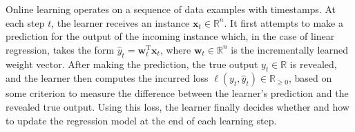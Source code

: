 Online learning operates on a sequence of data examples with timestamps. At each step $t$, the learner receives an instance $\mathbf{x}_t \in \mathbb{R}^n$. It first attempts to make a prediction for the output of the incoming instance which, in the case  of linear regression, takes the form $\hat{y}_t = \mathbf{w}_t^\text{T} \mathbf{x}_t$, where $\mathbf{w}_t \in \mathbb{R}^n$ is the incrementally learned weight vector. After making the prediction, the true output $y_t \in \mathbb{R}$ is revealed, and the learner then computes the incurred loss $\ell(y_t, \hat{y}_t) \in \mathbb{R}_{\geq 0}$, based on some criterion to measure the difference between the learner’s prediction and the revealed true output. Using this loss, the learner finally decides whether and how to update the regression model at the end of each learning step.

